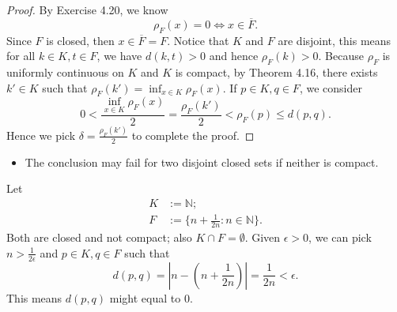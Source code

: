 \begin{Exercise}
\begin{proof}
By Exercise 4.20, we know
$$
\rho_F(x) = 0 \iff x\in \overline{F}.
$$
Since $F$ is closed, then $x\in \overline{F} = F$. Notice that $K$ and $F$ are disjoint, this means for all $k\in K, t\in F$, we have $d(k,t) > 0$ and hence $\rho_F(k) > 0$. Because $\rho_F$ is uniformly continuous on $K$ and $K$ is compact, by Theorem 4.16, there exists $k'\in K$ such that $\rho_F(k') = \inf_{x\in K} \rho_F(x)$.
If $p\in K, q\in F$, we consider
$$
0 < \frac{\inf_{x\in K} \rho_F(x)}{2}
= \frac{\rho_F(k')}{2} 
< \rho_F(p)
\leq d(p,q).
$$
Hence we pick $\delta = \frac{\rho_F(k')}{2}$ to complete the proof.
\end{proof}

\begin{itemize}
\item The conclusion may fail for two disjoint closed sets if neither is compact.
\end{itemize}
\begin{solution}
Let
\begin{align*}
K &:= \mathbb{N};\\
F &:= \{n+\frac{1}{2n}:n\in\mathbb{N} \}.
\end{align*}
Both are closed and not compact; also $K\cap F = \emptyset$. Given $\epsilon>0$, we can pick $n>\frac{1}{2\epsilon}$ and $p\in K,q\in F$ such that
$$
d(p,q) = \left| n-\left(n+\frac{1}{2n}\right) \right|
= \frac{1}{2n}
< \epsilon.
$$
This means $d(p,q)$ might equal to $0$.
\end{solution}
\end{Exercise}